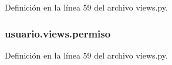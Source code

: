 Definición en la línea 59 del archivo views.\+py.

\subsubsection[{\texorpdfstring{permiso}{permiso}}]{\setlength{\rightskip}{0pt plus 5cm}usuario.\+views.\+permiso}\hypertarget{namespaceusuario_1_1views_a68d770ef541ea63e90a73d98640c60dc}{}\label{namespaceusuario_1_1views_a68d770ef541ea63e90a73d98640c60dc}


Definición en la línea 59 del archivo views.\+py.


